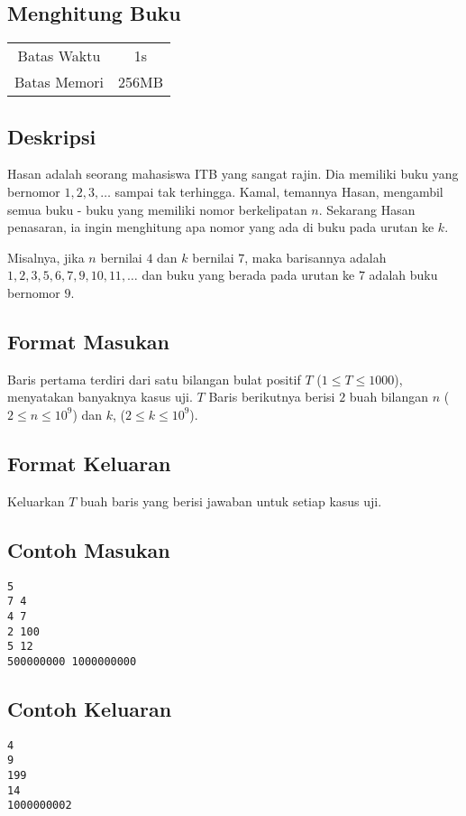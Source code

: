 \documentclass{article}
\begin{document}
\begin{center}
    \section*{Menghitung Buku}

    \begin{tabular}{ | c c | }
        \hline
        Batas Waktu  & 1s \\    %
        Batas Memori & 256MB \\  %
        \hline
    \end{tabular}
\end{center}

\subsection*{Deskripsi}

Hasan adalah seorang mahasiswa ITB yang sangat rajin. Dia memiliki buku yang bernomor $1, 2, 3, \dots$ sampai tak terhingga. Kamal, temannya Hasan, mengambil semua buku - buku yang memiliki nomor berkelipatan $n$. Sekarang Hasan penasaran, ia ingin menghitung apa nomor yang ada di buku pada urutan ke $k$.

Misalnya, jika $n$ bernilai $4$ dan $k$ bernilai $7$, maka barisannya adalah $1, 2, 3, 5, 6, 7, 9, 10, 11, \dots$ dan buku yang berada pada urutan ke $7$ adalah buku bernomor $9$.

\subsection*{Format Masukan}

Baris pertama terdiri dari satu bilangan bulat positif $T$ ($1 \leq T \leq 1000$), menyatakan banyaknya kasus uji.
$T$ Baris berikutnya berisi $2$ buah bilangan $n$ ($2 \leq n \leq 10^9$) dan $k$, ($2 \leq k \leq 10^9$).

\subsection*{Format Keluaran}

Keluarkan $T$ buah baris yang berisi jawaban untuk setiap kasus uji.
\\

\begin{multicols}{2}
\subsection*{Contoh Masukan}
\begin{lstlisting}
5
7 4
4 7
2 100
5 12
500000000 1000000000
\end{lstlisting}
\columnbreak
\subsection*{Contoh Keluaran}
\begin{lstlisting}
4
9
199
14
1000000002
\end{lstlisting}
\vfill
\null
\end{multicols}
\end{document}

